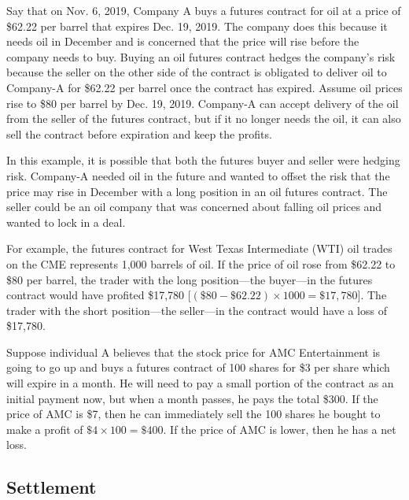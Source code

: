 \documentclass{article}
\begin{document}
    \begin{example}
      Say that on Nov. 6, 2019, Company A buys a futures contract for oil at a price of \$62.22 per barrel that expires Dec. 19, 2019. The company does this because it needs oil in December and is concerned that the price will rise before the company needs to buy. Buying an oil futures contract hedges the company's risk because the seller on the other side of the contract is obligated to deliver oil to Company-A for \$62.22 per barrel once the contract has expired. Assume oil prices rise to \$80 per barrel by Dec. 19, 2019. Company-A can accept delivery of the oil from the seller of the futures contract, but if it no longer needs the oil, it can also sell the contract before expiration and keep the profits. 

      In this example, it is possible that both the futures buyer and seller were hedging risk. Company-A needed oil in the future and wanted to offset the risk that the price may rise in December with a long position in an oil futures contract. The seller could be an oil company that was concerned about falling oil prices and wanted to lock in a deal. 

      For example, the futures contract for West Texas Intermediate (WTI) oil trades on the CME represents 1,000 barrels of oil. If the price of oil rose from \$62.22 to \$80 per barrel, the trader with the long position—the buyer—in the futures contract would have profited \$17,780 [$(\$80 - \$62.22) \times 1000 = \$17,780$]. The trader with the short position—the seller—in the contract would have a loss of \$17,780.
    \end{example}

    \begin{example}
      Suppose individual A believes that the stock price for AMC Entertainment is going to go up and buys a futures contract of 100 shares for \$3 per share which will expire in a month. He will need to pay a small portion of the contract as an initial payment now, but when a month passes, he pays the total \$300. If the price of AMC is \$7, then he can immediately sell the 100 shares he bought to make a profit of $\$4 \times 100 = \$400$. If the price of AMC is lower, then he has a net loss. 
    \end{example}

  \subsection{Settlement}
\end{document}
